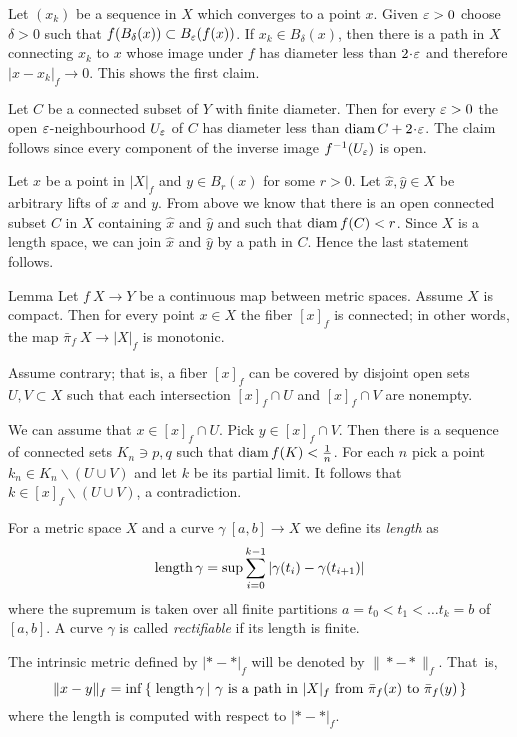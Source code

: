 \documentclass{article}
\begin{document}
Let $(x_k)$ be a sequence in $X$ which converges to a point $x$. 
Given $\varepsilon>0$ choose $\delta>0$ such that $f(B_\delta(x))\subset B_\varepsilon(f(x))$. 
If $x_k\in B_\delta(x)$, then there is a path in $X$ connecting $x_k$ to $x$ whose image under $f$ has diameter less than $2\cdot\eps$ and therefore $|x-x_k|_f\to 0$. 
This shows the first claim.

Let $C$ be a connected subset of $Y$ with finite diameter. 
Then for every $\varepsilon>0$ the open $\varepsilon$-neighbourhood $U_\varepsilon$ of $C$ has diameter less than $\diam C+2\cdot\eps$. 
The claim follows since every component of the inverse image $f^{-1}(U_\varepsilon)$ is open. 

Let $x$ be a point in $|X|_f$ and $y\in B_r(x)$ for some $r>0$. 
Let $\hat x,\hat y\in X$ be arbitrary lifts of $x$ and $y$.
From above we know that there is an open connected subset $C$ in $X$ containing $\hat x$ and $\hat y$ and such that 
$\mathop{\rm diam}\nolimits f(C)<r$. 
Since $X$ is a length space, we can join $\hat x$ and $\hat y$ by a path in $C$.
Hence the last statement follows.
\qeds

\begin{thm}{Lemma}\label{cor:fiberconnected}
Let $f\:X\to Y$ be a continuous map between metric spaces.
Assume $X$ is compact. 
Then for every point $x\in X$ the fiber $[x]_f$ is connected;
in other words, the map $\bar\pi_f\:X\to |X|_f$ is monotonic.
\end{thm}


Assume contrary;
that is, a fiber $[x]_f$ can be covered by disjoint open sets $U,V\subset X$ such that each intersection 
$[x]_f\cap U$ and $[x]_f\cap V$ are nonempty.

We can assume that $x\in [x]_f\cap U$.
Pick $y\in [x]_f\cap V$.
Then there is a sequence of connected sets $K_n\ni p,q$ such that $\mathop{\rm diam}\nolimits f(K)<\tfrac1n$.
For each $n$ pick a point $k_n\in K_n\backslash (U\cup V)$ and let $k$ be its partial limit.
It follows that $k\in [x]_f\backslash (U\cup V)$, a contradiction.
\qeds

For a metric space $X$ and a curve $\gamma\:[a,b]\to X$ we define its {\em length} as
\[\mathop{\rm length}\nolimits\gamma=\sup\sum_{i=0}^{k-1} |\gamma(t_i)-\gamma(t_{i+1})|\]
where the supremum is taken over all finite partitions ${a=t_0<t_1<\ldots t_k=b}$ of $[a,b]$. 
A curve $\gamma$ is called {\em rectifiable} if its length is finite.

The intrinsic metric defined by $|{*}-{*}|_f$ will be denoted by 
$\|{*}-{*}\|_f$. 
That~is, 
\[\|x-y\|_f
=
\inf
\set{\length\gamma}{\gamma\ \text{is a path in}\ |X|_f\ \text{from}\ \bar\pi_f(x) \ \text{to}\ \bar\pi_f(y)}\]
where the length is computed with respect to $|{*}-{*}|_f$. 
\end{document}
